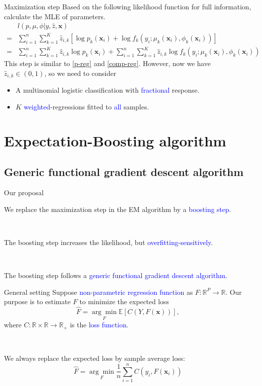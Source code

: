 \documentclass[professionalfont]{beamer}
\def\R{{\mathbb R}}  %
\def\E{{\mathbb E}}  %
\def\bx{\boldsymbol{x}}
\newcommand{\blue}[1]{\textcolor{blue}{#1}}
\begin{document}
\begin{frame}{Maximization step}
Based on the following likelihood function for full information, calculate the MLE of parameters.
	\begin{equation}
		\begin{aligned}
			&l(p,\mu,\phi|y,\hat{z},\bx)\\
			=&\sum_{i=1}^n\sum_{k=1}^K \hat{z}_{i,k}\left[\log p_k(\bx_i) + \log f_k(y_i;\mu_k(\bx_i),\phi_k(\bx_i))\right]\\
			=&\sum_{i=1}^n\sum_{k=1}^K \hat{z}_{i,k}\log p_k(\bx_i) + \sum_{i=1}^n\sum_{k=1}^K \hat{z}_{i,k}\log f_k(y_i;\mu_k(\bx_i),\phi_k(\bx_i))
		\end{aligned}
	\end{equation}
This step is similar to \eqref{p-reg} and \eqref{comp-reg}. However, now we have $\hat{z}_{i,k}\in(0,1)$, so we need to consider
\begin{itemize}
	\item A multinomial logistic classification with \blue{fractional} response.
	\item $K$ \blue{weighted}-regressions fitted to \blue{all} samples.
\end{itemize}
\end{frame}

\section{Expectation-Boosting algorithm}



\subsection{Generic functional gradient descent algorithm}
\begin{frame}{Our proposal}
	
	We replace the maximization step in the EM algorithm by a \blue{boosting step}.
	
	~
	
	The boosting step  increases the likelihood, but \blue{overfitting-sensitively}.
	
	
	~
	
	The boosting step follows a \blue{generic functional gradient descent algorithm}.
	
\end{frame}
\begin{frame}{General setting}
	Suppose \blue{non-parametric regression function} as $F:\R^P\rightarrow\R$. Our purpose is to  estimate $F$ to minimize the expected loss $$\hat{F}=\underset{F}{\arg\min}\E\left[C(Y,F(\bx))\right],$$
	where $C:\R\times\R\rightarrow\R_+$ is the \blue{loss function}.

	~

	We always replace the expected loss by sample average loss:
	$$\hat{F}=\underset{F}{\arg\min} \frac{1}{n}\sum_{i=1}^nC(y_i,F(\bx_i))$$
\end{frame}
\end{document}
